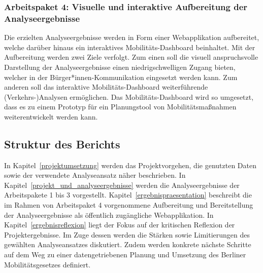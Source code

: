 \subsubsection{Arbeitspaket 4: Visuelle und interaktive Aufbereitung der Analyseergebnisse}

Die erzielten Analyseergebnisse werden in Form einer Webapplikation aufbereitet, welche darüber hinaus ein interaktives Mobilitäts-Dashboard beinhaltet. Mit der Aufbereitung werden zwei Ziele verfolgt. Zum einen soll die visuell anspruchsvolle Darstellung der Analyseergebnisse einen niedrigschwelligen Zugang bieten, welcher in der Bürger*innen-Kommunikation eingesetzt werden kann. Zum anderen soll das interaktive Mobilitäts-Dashboard weiterführende (Verkehrs-)Analysen ermöglichen. Das Mobilitäts-Dashboard wird so umgesetzt, dass es zu einem Prototyp für ein Planungstool von Mobilitätsmaßnahmen weiterentwickelt werden kann.

\subsection{Struktur des Berichts}
In Kapitel~\ref{projektumsetzung} werden das Projektvorgehen, die genutzten Daten sowie der verwendete Analyseansatz näher beschrieben. In Kapitel~\ref{projekt_und_analyseergebnisse} werden die Analyseergebnisse der Arbeitspakete 1 bis 3 vorgestellt. Kapitel~\ref{ergebnispraesentation} beschreibt die im Rahmen von Arbeitspaket 4 vorgenommene Aufbereitung und Bereitstellung der Analyseergebnisse als öffentlich zugängliche Webapplikation. In Kapitel~\ref{ergebnisreflexion} liegt der Fokus auf der kritischen Reflexion der Projektergebnisse. Im Zuge dessen werden die Stärken sowie Limitierungen des gewählten Analyseansatzes diskutiert. Zudem werden konkrete nächste Schritte auf dem Weg zu einer datengetriebenen Planung und Umsetzung des Berliner Mobilitätsgesetzes definiert.
